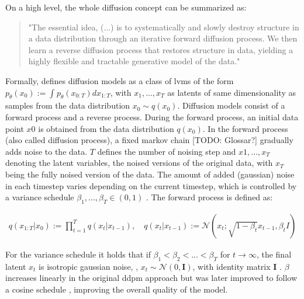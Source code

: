 On a high level, the whole diffusion concept can be summarized as:

\begin{quotation}
  "The essential idea, (...) is to systematically and slowly destroy structure in a data distribution through an iterative forward diffusion process. 
  We then learn a reverse diffusion process that restores structure in data, yielding a highly flexible and tractable generative model of the data." \cite[p. 1]{sohl-dickstein2015DeepUnsupervisedLearning}
\end{quotation}

Formally, \cite{ho2020DenoisingDiffusionProbabilistic} defines diffusion models as a class of \glspl{lvm} of the form $p_\theta(x_0):= \int_{}^{}p_\theta(x_{0:T})dx_{1:T}$,
with $x_1, ..., x_T$ as latents of same dimensionality as samples from the data distribution $x_0 \sim q(x_0)$.
Diffusion models consist of a forward process and a reverse process.
During the forward process, an initial data point $x0$ is obtained from the data distribution $q(x_0)$.
In the forward process (also called diffusion process), a fixed markov chain [TODO: Glossar?] gradually adds noise to the data.
$T$ defines the number of noising step and $x1,...,x_T$ denoting the latent variables, \ie the noised versions of the original data, with $x_T$ being the fully noised version of the data.
The amount of added (gaussian) noise in each timestep varies depending on the current timestep, which is controlled by a variance schedule $\beta_1, ..., \beta_T \in (0,1)$ \cite{ho2020DenoisingDiffusionProbabilistic}.
The forward process is defined as:

\begin{equation}
  \label{eqn:forwards_1}
  \begin{align*}
    q(x_{1:T} | x_0) := \prod_{t=1}^T q(x_t | x_{t-1}), \quad
    q(x_t | x_{t-1}) := \mathcal{N}(x_t; \sqrt{1 - \beta_t} x_{t-1}, \beta_t I)
  \end{align*}
\end{equation}

For the variance schedule it holds that if $\beta_1 < \beta_2 < ... < \beta_T$ for $t\rightarrow\infty$, the final latent $x_t$ is isotropic gaussian noise, \ie, $x_t \sim \mathcal{N}(0, \textbf{I})$, with identity matrix $\textbf{I}$ \cite{zbinden2022ImplementingExperimentingDiffusion}.
$\beta$ increases linearly in the original \gls{ddpm} approach \cite{ho2020DenoisingDiffusionProbabilistic} but was later improved to follow a cosine schedule \cite{nichol2021ImprovedDenoisingDiffusion}, improving the overall quality of the model.

